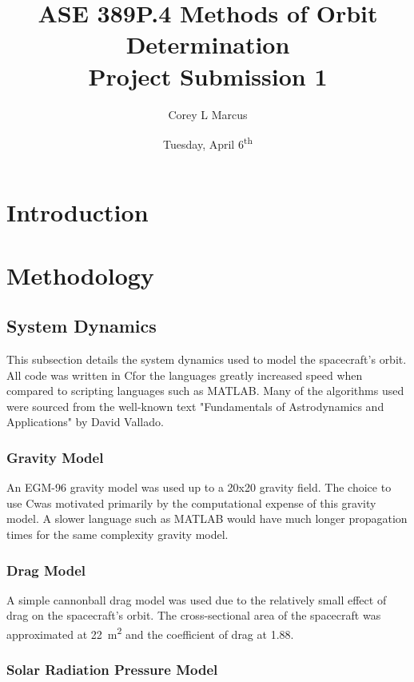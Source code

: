 \documentclass[11pt]{article}
\title{ASE 389P.4 Methods of Orbit Determination \\ Project Submission 1}
\author{Corey L Marcus} \date{Tuesday, April 6\textsuperscript{th}}
\def\CC{{C\nolinebreak[4]\hspace{-.05em}\raisebox{.4ex}{\tiny\bf ++}}}
\begin{document}
\onehalfspace
\maketitle


\section{Introduction}

\section{Methodology}

\subsection{System Dynamics}

This subsection details the system dynamics used to model the spacecraft's orbit. All code was written in \CC for the languages greatly increased speed when compared to scripting languages such as MATLAB. Many of the algorithms used were sourced from the well-known text "Fundamentals of Astrodynamics and Applications" by David Vallado.

\subsubsection{Gravity Model}

An EGM-96 gravity model was used up to a 20x20 gravity field. The choice to use \CC was motivated primarily by the computational expense of this gravity model. A slower language such as MATLAB would have much longer propagation times for the same complexity gravity model.

\subsubsection{Drag Model}

A simple cannonball drag model was used due to the relatively small effect of drag on the spacecraft's orbit. The cross-sectional area of the spacecraft was approximated at \SI{22}{\meter\squared} and the coefficient of drag at 1.88.

\subsubsection{Solar Radiation Pressure Model}
\end{document}
